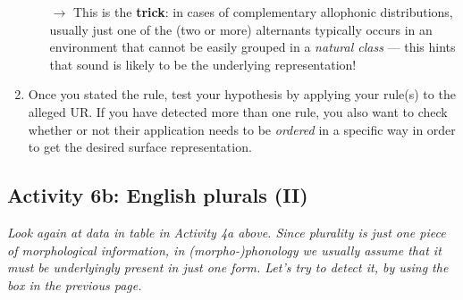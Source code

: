 \documentclass[11pt, oneside]{article}   	%
\begin{document}
\begin{tcolorbox}
\begin{enumerate}
\begin{enumerate}
		\item[$\rightarrow$] This is the {\bfseries trick}: in cases of complementary allophonic distributions, usually just one of the (two or more) alternants typically occurs in an environment that cannot be easily grouped in a {\itshape natural class} --- this hints that sound is likely to be the underlying representation!
	\end{enumerate}
\item Once you stated the rule, test your hypothesis by applying your rule(s) to the alleged UR. If you have detected more than one rule, you also want to check whether or not their application needs to be {\itshape ordered} in a specific way in order to get the desired surface representation.
\end{enumerate}

\end{tcolorbox}


\subsection{Activity 6b: English plurals (II)}

{\itshape Look again at data in table in Activity 4a above. Since plurality is just one piece of morphological information, in (morpho-)phonology we usually assume that it must be underlyingly present in just one form. Let's try to detect it, by using the box in the previous page.}
\end{document}
